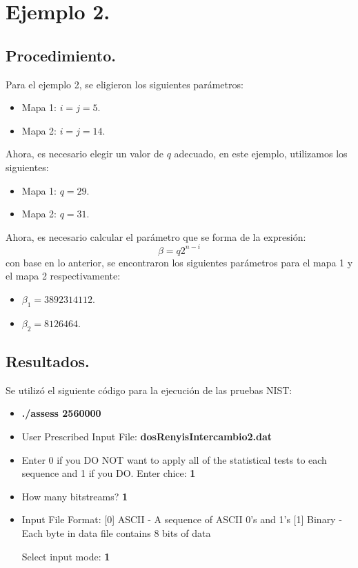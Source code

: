\documentclass[10pt]{IEEEtran}
\begin{document}
 
\section{Ejemplo 2.}

\subsection{Procedimiento.}
Para el ejemplo 2, se eligieron los siguientes parámetros:

\begin{itemize}
\item Mapa 1: $i = j = 5$.


\item Mapa 2: $i = j = 14$.
\end{itemize}

Ahora, es necesario elegir un valor de $q$ adecuado, en este ejemplo, utilizamos los siguientes:

\begin{itemize}
\item Mapa 1: $q = 29.$
\item Mapa 2: $q = 31.$
\end{itemize}


Ahora, es necesario calcular el parámetro que se forma de la expresión:  
\begin{equation}
\beta = q 2^{n-i}
\end{equation}
con base en lo anterior, se encontraron los siguientes parámetros para el mapa 1 y el mapa 2 respectivamente:

\begin{itemize}
\item $\beta_{1}=3892314112$.
\item $\beta_{2}=8126464$.
\end{itemize}







\subsection{Resultados.}


Se utilizó el siguiente código para la ejecución de las pruebas NIST:


\begin{itemize}
\item \textbf{./assess 2560000}
\item User Prescribed Input File: \textbf{dosRenyisIntercambio2.dat}
\item    Enter 0 if you DO NOT want to apply all of the
         statistical tests to each sequence and 1 if you DO. Enter chice: \textbf{1}
                  
\item  How many bitstreams? \textbf{1}

\item Input File Format:
    [0] ASCII - A sequence of ASCII 0's and 1's
    [1] Binary - Each byte in data file contains 8 bits of data

   Select input mode:  \textbf{1}
\end{itemize}
\end{document}
